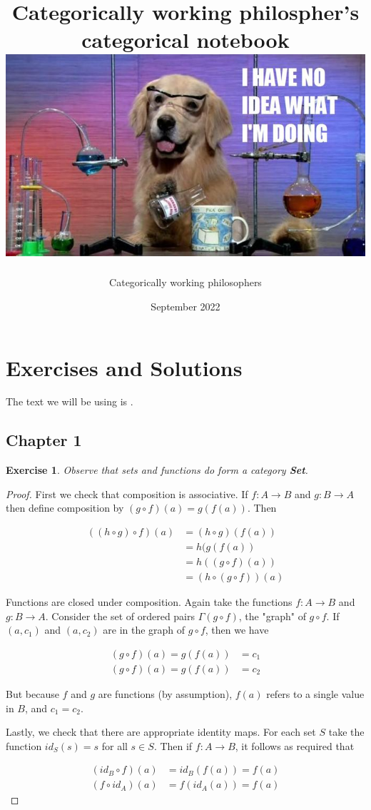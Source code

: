 \documentclass[12pt]{article}
\title{{Categorically working philospher's categorical notebook}\\
{\includegraphics[width=\textwidth]{dog.jpg}}}
\author{Categorically working philosophers}
\date{September 2022}
\newcommand{\catname}[1]{{\normalfont\textbf{#1}}}
\newtheorem*{exercise}{Exercise}
\begin{document}
\maketitle

\section{Exercises and Solutions}

The text we will be using is \autocite{simmons2011introduction}.

\subsection{Chapter 1}

\begin{exercise}Observe that sets and functions do form a category \catname{Set}.\end{exercise}

\begin{proof}
First we check that composition is associative. If $f: A \rightarrow B$ and $g: B \rightarrow A$ then define composition by $(g \circ f)(a) = g(f(a))$. Then 

\begin{align*}
((h \circ g ) \circ f)(a) 
&= (h \circ g)(f(a)) \\
&= h(g(f(a)) \\
&= h((g \circ f)(a)) \\
&= (h \circ (g \circ f))(a)
\end{align*}

Functions are closed under composition. Again take the functions $f: A \rightarrow B$ and $g: B \rightarrow A$. Consider the set of ordered pairs $\Gamma(g \circ f)$, the "graph" of $g \circ f$. If $(a, c_1)$ and $(a, c_2)$ are in the graph of $g \circ f$, then we have 

\begin{align*}
(g \circ f)(a) = g(f(a)) &= c_1 \\
(g \circ f)(a) = g(f(a)) &= c_2
\end{align*}

But because $f$ and $g$ are functions (by assumption), $f(a)$ refers to a single value in $B$, and $c_1 = c_2$.

Lastly, we check that there are appropriate identity maps. For each set $S$ take the function $id_S(s) = s$ for all $s \in S$. Then if $f: A \rightarrow B$, it follows as required that

\begin{align*}
(id_B \circ f)(a) &= id_B(f(a)) = f(a) \\
(f \circ id_A)(a) &= f(id_A(a)) = f(a) 
\end{align*}

\end{proof}
\end{document}
